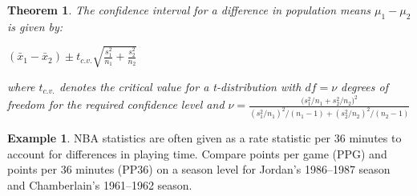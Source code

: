 \documentclass[
  11pt,
]{book}
\newenvironment{Shaded}{\begin{snugshade}}{\end{snugshade}}
\newcommand{\AttributeTok}[1]{\textcolor[rgb]{0.77,0.63,0.00}{#1}}
\newcommand{\DecValTok}[1]{\textcolor[rgb]{0.00,0.00,0.81}{#1}}
\newcommand{\FunctionTok}[1]{\textcolor[rgb]{0.00,0.00,0.00}{#1}}
\newcommand{\NormalTok}[1]{#1}
\newcommand{\OtherTok}[1]{\textcolor[rgb]{0.56,0.35,0.01}{#1}}
\newcommand{\SpecialCharTok}[1]{\textcolor[rgb]{0.00,0.00,0.00}{#1}}
\newcommand{\StringTok}[1]{\textcolor[rgb]{0.31,0.60,0.02}{#1}}
\newtheorem{theorem}{Theorem}[chapter]
\theoremstyle{definition}
\theoremstyle{definition}
\newtheorem{example}{Example}[chapter]
\theoremstyle{definition}
\theoremstyle{definition}
\theoremstyle{remark}
\begin{document}
\begin{theorem}
The confidence interval for a difference in population means \(\mu_1 - \mu_2\) is given by:

\((\bar{x}_1 - \bar{x}_2) \pm t_{c.v.} \sqrt{\frac{s_1^2}{n_1}+\frac{s_2^2}{n_2}}\)

where \(t_{c.v.}\) denotes the critical value for a t-distribution with \(df=\nu\) degrees of freedom for the required confidence level and \(\nu = \frac{\big(s_1^2/n_1 + s_2^2/n_2\big)^2}{(s_1^2/n_1)^2/(n_1-1) + (s_2^2/n_2)^2/(n_2-1)}\)
\end{theorem}

\begin{example}
NBA statistics are often given as a rate statistic per 36 minutes to account for differences in playing time. Compare points per game (PPG) and points per 36 minutes (PP36) on a season level for Jordan's 1986--1987 season and Chamberlain's 1961--1962 season.
\end{example}

\begin{Shaded}
\end{Shaded}
\end{document}
